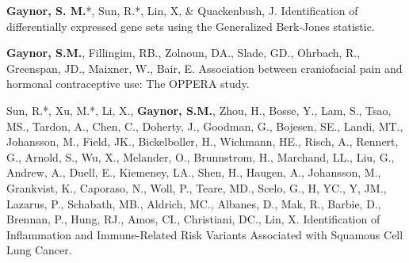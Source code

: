 \begin{cvpapers}
\cvpaper
{\textbf{Gaynor, S. M.}*, Sun, R.*, Lin, X, \& Quackenbush, J.  Identification of differentially expressed gene sets using the Generalized Berk-Jones statistic.} %
{} %
{ } %
{} %

\cvpaper
{\textbf{Gaynor, S.M.}, Fillingim, RB., Zolnoun, DA., Slade, GD., Ohrbach, R., Greenspan, JD., Maixner, W., Bair, E.  Association between craniofacial pain and hormonal contraceptive use: The OPPERA study.} %
{} %
{ } %
{} %

\cvpaper
{Sun, R.*, Xu, M.*, Li, X., \textbf{Gaynor, S.M.}, Zhou, H., Bosse, Y., Lam, S., Tsao, MS., Tardon, A., Chen, C., Doherty, J., Goodman, G., Bojesen, SE., Landi, MT., Johansson, M., Field, JK., Bickelboller, H., Wichmann, HE.,
Risch, A., Rennert, G., Arnold, S., Wu, X., Melander, O., Brunnstrom, H., Marchand, LL., Liu, G., Andrew, A., Duell, E., Kiemeney, LA., Shen, H., Haugen, A., Johansson, M., Grankvist, K., Caporaso, N., Woll, P., Teare, MD., Scelo, G., H, YC., Y, JM., Lazarus, P., Schabath, MB., Aldrich, MC., Albanes, D., Mak, R., Barbie, D., Brennan, P., Hung, RJ., Amos, CI., Christiani, DC., Lin, X.  Identification of Inflammation and Immune-Related Risk Variants Associated with Squamous Cell Lung Cancer.} %
{} %
{ } %
{} %



\end{cvpapers}

